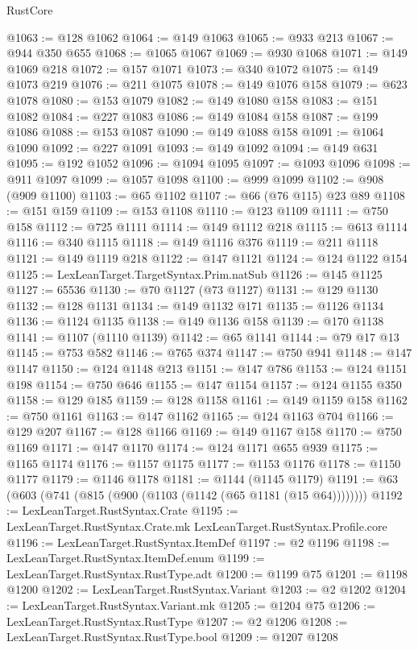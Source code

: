 \begin{lexlean}{RustCore}
\begin{coremodule}
@1063 := @128 @1062
@1064 := @149 @1063
@1065 := @933 @213
@1067 := @944 @350 @655
@1068 := @1065 @1067
@1069 := @930 @1068
@1071 := @149 @1069 @218
@1072 := @157 @1071
@1073 := @340 @1072
@1075 := @149 @1073 @219
@1076 := @211 @1075
@1078 := @149 @1076 @158
@1079 := @623 @1078
@1080 := @153 @1079
@1082 := @149 @1080 @158
@1083 := @151 @1082
@1084 := @227 @1083
@1086 := @149 @1084 @158
@1087 := @199 @1086
@1088 := @153 @1087
@1090 := @149 @1088 @158
@1091 := @1064 @1090
@1092 := @227 @1091
@1093 := @149 @1092
@1094 := @149 @631
@1095 := @192 @1052
@1096 := @1094 @1095
@1097 := @1093 @1096
@1098 := @911 @1097
@1099 := @1057 @1098
@1100 := @999 @1099
@1102 := @908 (@909 @1100)
@1103 := @65 @1102
@1107 := @66 (@76 @115) @23 @89
@1108 := @151 @159
@1109 := @153 @1108
@1110 := @123 @1109
@1111 := @750 @158
@1112 := @725 @1111
@1114 := @149 @1112 @218
@1115 := @613 @1114
@1116 := @340 @1115
@1118 := @149 @1116 @376
@1119 := @211 @1118
@1121 := @149 @1119 @218
@1122 := @147 @1121
@1124 := @124 @1122 @154
@1125 := LexLeanTarget.TargetSyntax.Prim.natSub
@1126 := @145 @1125
@1127 := 65536
@1130 := @70 @1127 (@73 @1127)
@1131 := @129 @1130
@1132 := @128 @1131
@1134 := @149 @1132 @171
@1135 := @1126 @1134
@1136 := @1124 @1135
@1138 := @149 @1136 @158
@1139 := @170 @1138
@1141 := @1107 (@1110 @1139)
@1142 := @65 @1141
@1144 := @79 @17 @13
@1145 := @753 @582
@1146 := @765 @374
@1147 := @750 @941
@1148 := @147 @1147
@1150 := @124 @1148 @213
@1151 := @147 @786
@1153 := @124 @1151 @198
@1154 := @750 @646
@1155 := @147 @1154
@1157 := @124 @1155 @350
@1158 := @129 @185
@1159 := @128 @1158
@1161 := @149 @1159 @158
@1162 := @750 @1161
@1163 := @147 @1162
@1165 := @124 @1163 @704
@1166 := @129 @207
@1167 := @128 @1166
@1169 := @149 @1167 @158
@1170 := @750 @1169
@1171 := @147 @1170
@1174 := @124 @1171 @655 @939
@1175 := @1165 @1174
@1176 := @1157 @1175
@1177 := @1153 @1176
@1178 := @1150 @1177
@1179 := @1146 @1178
@1181 := @1144 (@1145 @1179)
@1191 := @63 (@603 (@741 (@815 (@900 (@1103 (@1142 (@65 @1181 (@15 @64))))))))
@1192 := LexLeanTarget.RustSyntax.Crate
@1195 := LexLeanTarget.RustSyntax.Crate.mk LexLeanTarget.RustSyntax.Profile.core
@1196 := LexLeanTarget.RustSyntax.ItemDef
@1197 := @2 @1196
@1198 := LexLeanTarget.RustSyntax.ItemDef.enum
@1199 := LexLeanTarget.RustSyntax.RustType.adt
@1200 := @1199 @75
@1201 := @1198 @1200
@1202 := LexLeanTarget.RustSyntax.Variant
@1203 := @2 @1202
@1204 := LexLeanTarget.RustSyntax.Variant.mk
@1205 := @1204 @75
@1206 := LexLeanTarget.RustSyntax.RustType
@1207 := @2 @1206
@1208 := LexLeanTarget.RustSyntax.RustType.bool
@1209 := @1207 @1208

\end{coremodule}
\end{lexlean}
